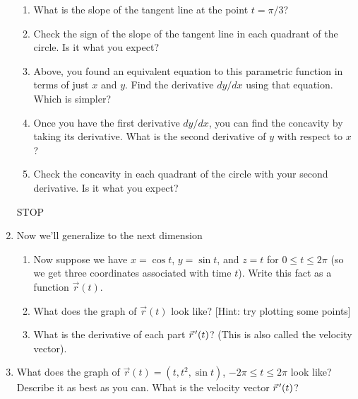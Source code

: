 \documentclass[11pt]{article}
\newcommand{\sstop}{\smallskip\begin{center}STOP\end{center}\smallskip}
\begin{document}
\begin{enumerate}
\begin{enumerate}
  \item What is the slope of the tangent line at the point $t=\pi/3$?
  \item Check the sign of the slope of the tangent line in each quadrant of the circle.  Is it what you expect?
  \item Above, you found an equivalent equation to this parametric function in terms of just $x$ and $y$.  Find the derivative $dy/dx$ using that equation.  Which is simpler?
  \item Once you have the first derivative $dy/dx$, you can find the concavity by taking its derivative.  What is the second derivative of $y$ with respect to $x$?
  \item Check the concavity in each quadrant of the circle with your second derivative.  Is it what you expect?
  \end{enumerate}

\sstop

\item Now we'll generalize to the next dimension
  \begin{enumerate}
  \item Now suppose we have $x=\cos t$, $y=\sin t$, and $z=t$ for $0\leq t\leq2\pi$ (so we get three coordinates associated with time $t$).  Write this fact as a function $\vec r(t)$.
  \item What does the graph of $\vec r(t)$ look like? [Hint: try plotting some points]
  \item What is the derivative of each part $\vec r^{\thinspace\prime}(t)$?  (This is also called the velocity vector).
  \end{enumerate}
\item What does the graph of $\vec r(t)=(t,t^2,\sin t)$, $-2\pi\leq t\leq 2\pi$ look like?  Describe it as best as you can.  What is the velocity vector $\vec r^{\thinspace\prime}(t)$?

\end{enumerate}
\end{document}
